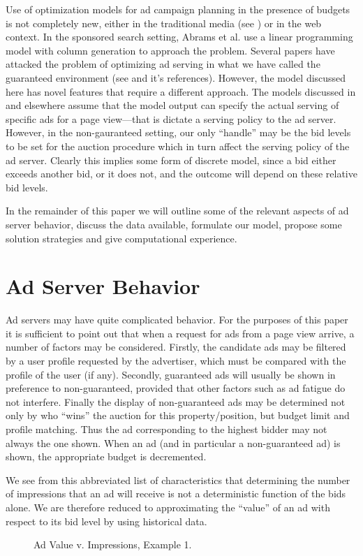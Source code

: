 \documentclass[finalversion,simpleeqnnos]{yrl}
\begin{document}
Use of optimization models for ad campaign planning in the presence of budgets is not completely new, either in the traditional media (see \cite{NBC}) or in the web context. In the sponsored search setting, Abrams et al.\cite{AMT} use a linear programming model with column generation to approach the problem. Several papers have attacked the problem of optimizing ad serving in what we have called the guaranteed environment (see \cite{Abe} and it's references). However, the model discussed here has novel features that require a different approach. The 
models discussed in \cite{Abe} and elsewhere assume that the model output can specify the actual serving of specific ads for a page view---that is dictate a serving policy to the ad server. However, in the non-gauranteed setting, our only ``handle'' may be the bid levels to be set for the auction procedure which in turn affect the serving policy of the ad server. Clearly this implies some form of discrete model, since a bid either exceeds another bid, or it does not, and the outcome will depend on these relative bid levels.

In the remainder of this paper we will outline some of the relevant aspects of ad server behavior, discuss the data available, formulate our model, propose some solution strategies and give computational experience.


\section{Ad Server Behavior}

Ad servers may have quite complicated behavior. For the purposes of this paper it is sufficient to point out that when a request for ads from a page view arrive, a number of factors may be considered. Firstly, the candidate ads may be filtered by a user profile requested by the advertiser, which must be compared with the profile of the user (if any). Secondly, guaranteed ads will usually be shown in preference to non-guaranteed, provided that other factors such as ad fatigue do not interfere. Finally the display of non-guaranteed ads may be determined not only by who ``wins'' the auction for this property/position, but budget limit and profile matching. Thus the ad corresponding to the highest bidder may not always the one shown. When an ad (and in particular a non-guaranteed ad) is shown, the appropriate budget is decremented.

We see from this abbreviated list of characteristics that determining the number of impressions that an ad will receive is not a deterministic  function of the bids alone. We are therefore reduced to approximating the ``value'' of an ad with respect to its bid level by using historical data.
\begin{figure}[htfb]
\begin{center}
\hspace{0.0cm}
\caption{Ad Value v. Impressions, Example 1.} \label{fig-1}
\end{center}
\end{figure}
\end{document}
